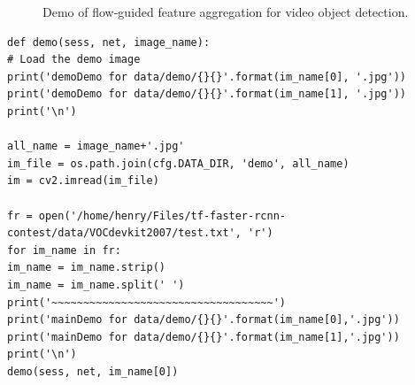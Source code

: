 \documentclass[a4paper]{article}
\begin{document}
\begin{figure}
	\centering 
	\caption{Demo of flow-guided feature aggregation for video object detection.} 
	\label{p3} %
\end{figure}

\lstset{language=python}
\begin{lstlisting}
def demo(sess, net, image_name):
# Load the demo image
print('demoDemo for data/demo/{}{}'.format(im_name[0], '.jpg'))
print('demoDemo for data/demo/{}{}'.format(im_name[1], '.jpg'))
print('\n')

all_name = image_name+'.jpg'
im_file = os.path.join(cfg.DATA_DIR, 'demo', all_name)
im = cv2.imread(im_file)

fr = open('/home/henry/Files/tf-faster-rcnn-contest/data/VOCdevkit2007/test.txt', 'r')
for im_name in fr:
im_name = im_name.strip()
im_name = im_name.split(' ')
print('~~~~~~~~~~~~~~~~~~~~~~~~~~~~~~~~~~~')
print('mainDemo for data/demo/{}{}'.format(im_name[0],'.jpg'))
print('mainDemo for data/demo/{}{}'.format(im_name[1],'.jpg'))
print('\n')
demo(sess, net, im_name[0])
\end{lstlisting}\label{g2}
\end{document}
